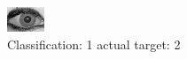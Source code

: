 \begin{figure}[h!]
\begin{center}
\includegraphics[width=0.60\columnwidth]{figures/ID2008_class_1_target_2.png}
\end{center}
\caption{ Classification: 1 actual target: 2}
\label{fig:ID2008_class_1_target_2}
\end{figure}
